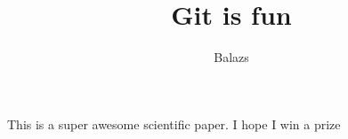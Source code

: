 \documentclass[10pt]{article}
\author{Balazs}
\title{Git is fun}
\begin{document}
	\maketitle

	This is a super awesome scientific paper.
	I hope I win a prize
\end{document}
